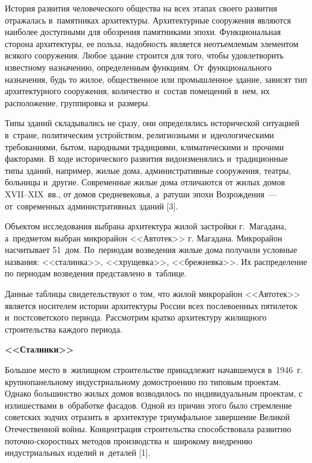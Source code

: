 



\makeProcTitle
{}

История развития человеческого общества на всех этапах своего развития отражалась в~памятниках архитектуры. Архитектурные сооружения являются наиболее доступными для обозрения памятниками эпохи. Функциональная сторона архитектуры, ее польза, надобность является неотъемлемым элементом всякого сооружения. Любое здание строится для того, чтобы удовлетворить известному назначению, определенным функциям. От~функционального назначения, будь то жилое, общественное или промышленное здание, зависят тип архитектурного сооружения, количество и~состав помещений в~нем, их расположение, группировка и~размеры.

Типы зданий складывались не сразу, они определялись исторической ситуацией в~стране, политическим устройством, религиозными и~идеологическими требованиями, бытом, народными традициями, климатическими и~прочими факторами. В ходе исторического развития видоизменялись и~традиционные типы зданий, например, жилые дома, административные сооружения, театры, больницы и~другие. Современные жилые дома отличаются от жилых домов XVII--XIX~вв., от домов средневековья, а~ратуши эпохи Возрождения~--- от~современных административных зданий [3].

Объектом исследования выбрана архитектура жилой застройки г.~Магадана, а~предметом выбран микрорайон <<Автотек>> г. Магадана. Микрорайон насчитывает 51~дом. По~периодам возведения жилые дома получили условные названия: <<сталинка>>, <<хрущевка>>, <<брежневка>>. Их распределение по периодам возведения представлено в~таблице.



Данные таблицы свидетельствуют о том, что жилой микрорайон <<Автотек>> является носителем истории архитектуры России всех послевоенных пятилеток и~постсоветского периода. Рассмотрим кратко архитектуру жилищного строительства каждого периода.

\textbf{<<Сталинки>>}

Большое место в~жилищном строительстве принадлежит начавшемуся в~1946~г. крупнопанельному индустриальному домостроению по типовым проектам. Однако большинство жилых домов возводилось по индивидуальным проектам, с излишествами в~обработке фасадов. Одной из причин этого было стремление советских зодчих отразить в~архитектуре триумфальное завершение Великой Отечественной войны. Концентрация строительства способствовала развитию поточно-скоростных методов производства и~широкому внедрению индустриальных изделий и~деталей [1].

